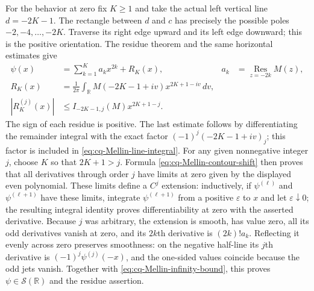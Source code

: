 For the behavior at zero fix $K\geq1$ and take the actual
left vertical line $d=-2K-1$. The rectangle between $d$ and
$c$ has precisely the possible poles $-2,-4,\ldots,-2K$.
Traverse its right edge upward and its left edge downward;
this is the positive orientation. The residue theorem and
the same horizontal estimates give
\begin{equation}\label{eq:cq-Mellin-contour-shift}
 \begin{aligned}
 \psi(x)&=\sum_{k=1}^K a_kx^{2k}+R_K(x),
 &a_k&=\operatorname*{Res}_{z=-2k}M(z),\\
 R_K(x)&=\frac1{2\pi}\int_{\mathbb R}
                    M(-2K-1+iv)x^{2K+1-iv}\,dv,\\
 |R_K^{(j)}(x)|&\leq I_{-2K-1,j}(M)x^{2K+1-j}.
 \end{aligned}
\end{equation}
The sign of each residue is positive. The last estimate follows
by differentiating the remainder integral with the exact factor
$(-1)^j(-2K-1+iv)_j$; this factor is included in
\eqref{eq:cq-Mellin-line-integral}.
For any given nonnegative integer $j$, choose $K$ so that
$2K+1>j$. Formula \eqref{eq:cq-Mellin-contour-shift} then
proves that all derivatives through order $j$ have limits at zero
given by the displayed even polynomial. These limits define a
$C^j$ extension: inductively, if $\psi^{(\ell)}$ and
$\psi^{(\ell+1)}$ have these limits, integrate
$\psi^{(\ell+1)}$ from a positive $\varepsilon$ to $x$ and
let $\varepsilon\downarrow0$; the resulting integral identity
proves differentiability at zero with the asserted derivative.
Because $j$ was arbitrary, the extension is smooth, has value
zero, all its odd derivatives vanish at zero, and its $2k$th
derivative is $(2k)!a_k$. Reflecting it evenly across zero
preserves smoothness: on the negative half-line its $j$th
derivative is $(-1)^j\psi^{(j)}(-x)$, and the one-sided
values coincide because the odd jets vanish. Together with
\eqref{eq:cq-Mellin-infinity-bound}, this proves
$\psi\in\mathcal S(\mathbb R)$ and the residue assertion.

